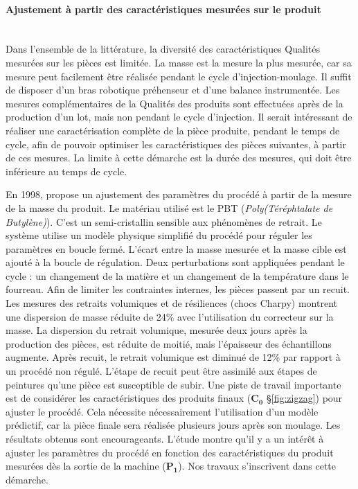 \paragraph{Ajustement à partir des caractéristiques mesurées sur le produit}\mbox{} \\
Dans l'ensemble de la littérature, la diversité des caractéristiques Qualités mesurées sur les pièces est limitée.
La masse est la mesure la plus mesurée, car sa mesure peut facilement être réalisée pendant le cycle d'injection-moulage.
Il suffit de disposer d'un bras robotique préhenseur et d'une balance instrumentée.
Les mesures complémentaires de la Qualités des produits sont effectuées après de la production d'un lot, mais non pendant le cycle d'injection.
Il serait intéressant de réaliser une caractérisation complète de la pièce produite, pendant le temps de cycle, afin de pouvoir optimiser les caractéristiques des pièces suivantes, à partir de ces mesures.
La limite à cette démarche est la durée des mesures, qui doit être inférieure au temps de cycle.

En 1998, \cite{fournier_conduite_2006} propose un ajustement des paramètres du procédé à partir de la mesure de la masse du produit.
Le matériau utilisé est le PBT (\textit{Poly(Téréphtalate de Butylène)}).
C'est un semi-cristallin sensible aux phénomènes de retrait.
Le système utilise un modèle physique simplifié du procédé pour réguler les paramètres en boucle fermé.
L'écart entre la masse mesurée et la masse cible est ajouté à la boucle de régulation.
Deux perturbations sont appliquées pendant le cycle : un changement de la matière et un changement de la température dans le fourreau.
Afin de limiter les contraintes internes, les pièces passent par un recuit.
Les mesures des retraits volumiques et de résiliences (chocs Charpy) montrent une dispersion de masse réduite de 24\% avec l'utilisation du correcteur sur la masse.
La dispersion du retrait volumique, mesurée deux jours après la production des pièces, est réduite de moitié, mais l'épaisseur des échantillons augmente.
Après recuit, le retrait volumique est diminué de 12\% par rapport à un procédé non régulé.
L'étape de recuit peut être assimilé aux étapes de peintures qu'une pièce est susceptible de subir.
Une piste de travail importante est de considérer les caractéristiques des produits finaux ($\boldsymbol{C_0}$ §\ref{fig:zigzag}) pour ajuster le procédé.
Cela nécessite nécessairement l'utilisation d'un modèle prédictif, car la pièce finale sera réalisée plusieurs jours après son moulage.
Les résultats obtenus sont encourageants.
L'étude montre qu'il y a un intérêt à ajuster les paramètres du procédé en fonction des caractéristiques du produit mesurées dès la sortie de la machine ($\boldsymbol{P_1}$).
Nos travaux s'inscrivent dans cette démarche.


